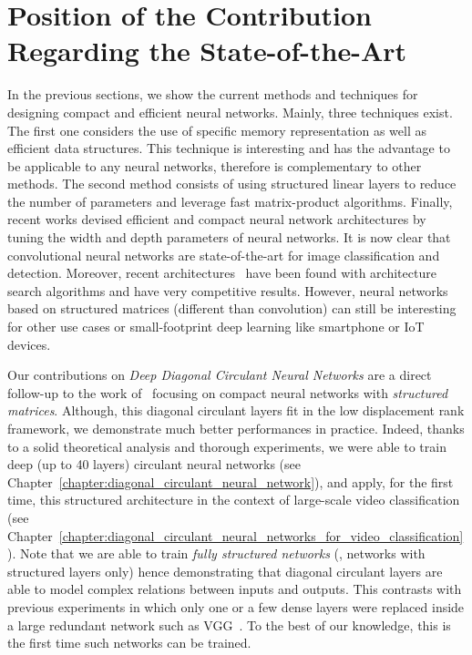 \section{Position of the Contribution Regarding the State-of-the-Art}
\label{section:p1-ch3_position_of_the_contributions_regarding_the_state-of-the-art}


In the previous sections, we show the current methods and techniques for designing compact and efficient neural networks. 
Mainly, three techniques exist.
The first one considers the use of specific memory representation as well as efficient data structures.
This technique is interesting and has the advantage to be applicable to any neural networks, therefore is complementary to other methods.
The second method consists of using structured linear layers to reduce the number of parameters and leverage fast matrix-product algorithms. 
Finally, recent works devised efficient and compact neural network architectures by tuning the width and depth parameters of neural networks.
It is now clear that convolutional neural networks are state-of-the-art for image classification and detection.
Moreover, recent architectures~\cite{tan2019efficientnet} have been found with architecture search algorithms and have very competitive results. 
However, neural networks based on structured matrices (different than convolution) can still be interesting for other use cases or small-footprint deep learning like smartphone or IoT devices. 

Our contributions on \emph{Deep Diagonal Circulant Neural Networks} are a direct follow-up to the work of~\citet{cheng2015exploration,sindhwani2015structured,moczulski2016acdc,thomas2018learning} focusing on compact neural networks with \emph{structured matrices}.
Although, this diagonal circulant layers fit in the low displacement rank framework, we demonstrate much better performances in practice.
Indeed, thanks to a solid theoretical analysis and thorough experiments, we were able to train deep (up to 40 layers) circulant neural networks (see Chapter~\ref{chapter:diagonal_circulant_neural_network}), and apply, for the first time, this structured architecture in the context of large-scale video classification (see Chapter~\ref{chapter:diagonal_circulant_neural_networks_for_video_classification}).
Note that we are able to train \emph{fully structured networks} (\ie, networks with structured layers only) hence demonstrating that diagonal circulant layers are able to model complex relations between inputs and outputs.
This contrasts with previous experiments in which only one or a few dense layers were replaced inside a large redundant network such as VGG~\cite{simonyan2014very}.
To the best of our knowledge, this is the first time such networks can be trained.  




